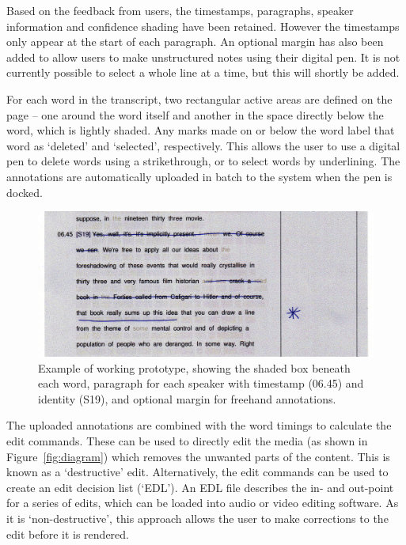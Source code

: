 Based on the feedback from users, the timestamps, paragraphs, speaker
information and confidence shading have been retained. However the timestamps
only appear at the start of each paragraph. An optional margin has also been
added to allow users to make unstructured notes using their digital pen. 
It is not currently possible to select a whole line at a time, but this will
shortly be added.

For each word in the transcript, two rectangular active areas are defined on
the page -- one around the word itself and another in the space directly below
the word, which is lightly shaded. Any marks made on or below the word label
that word as `deleted' and `selected', respectively. This allows the user to
use a digital pen to delete words using a strikethrough, or to select words by
underlining.  The annotations are automatically uploaded in batch to the system
when the pen is docked.

\begin{figure}[h]
  \centering
  \includegraphics[width=\columnwidth]{figs/interface-darkened}
  \caption{Example of working prototype, showing the shaded box beneath each
    word, paragraph for each speaker with timestamp (06.45) and identity (S19),
    and optional margin for freehand annotations.}
  \label{fig:layout}
\end{figure}

The uploaded annotations are combined with the word timings to calculate the
edit commands.  These can be used to directly edit the media (as shown in
Figure~\ref{fig:diagram}) which removes the unwanted parts of the content. This
is known as a `destructive' edit.  Alternatively, the edit commands can be used
to create an edit decision list (`EDL'). An EDL file describes the in- and
out-point for a series of edits, which can be loaded into audio or video
editing software.  As it is `non-destructive', this approach allows the user to
make corrections to the edit before it is rendered. 

